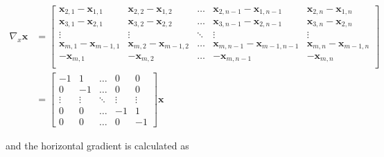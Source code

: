 \documentclass[12pt]{article}
\begin{document}
\begin{equation}
  \begin{aligned}
  \nabla_{x} \mathbf{x} &= \begin{bmatrix}
    \mathbf{x}_{2,1} - \mathbf{x}_{1,1} & \mathbf{x}_{2, 2} - \mathbf{x}_{1, 2} & \ldots & \mathbf{x}_{2, n-1} - \mathbf{x}_{1, n-1} & \mathbf{x}_{2, n} - \mathbf{x}_{1, n} \\
    \mathbf{x}_{3,1} - \mathbf{x}_{2,1} & \mathbf{x}_{3, 2} - \mathbf{x}_{2, 2} & \ldots & \mathbf{x}_{3, n-1} - \mathbf{x}_{2, n-1} & \mathbf{x}_{3, n} - \mathbf{x}_{2, n}  \\
    \vdots & \vdots & \ddots & \vdots & \vdots \\
    \mathbf{x}_{m,1} - \mathbf{x}_{m-1,1} & \mathbf{x}_{m, 2} - \mathbf{x}_{m-1, 2} & \ldots & \mathbf{x}_{m, n-1} - \mathbf{x}_{m-1, n-1} & \mathbf{x}_{m, n} - \mathbf{x}_{m-1, n} \\
    - \mathbf{x}_{m, 1} & - \mathbf{x}_{m, 2} & \ldots & - \mathbf{x}_{m, n-1} & - \mathbf{x}_{m, n} \\
  \end{bmatrix} \\
  &= \begin{bmatrix}
    -1 & 1 & \ldots & 0 & 0 \\
    0 & -1 & \ldots & 0 & 0 \\
     \vdots & \vdots & \ddots & \vdots & \vdots \\
    0 & 0 & \ldots & -1 & 1 \\
    0 & 0 & \ldots & 0 & -1
    \end{bmatrix} \mathbf{x}
  \end{aligned}
\end{equation}

and the horizontal gradient is calculated as
\end{document}
